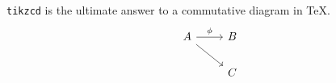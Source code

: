 \documentclass[12pt]{amsart}
\theoremstyle{plain}
\theoremstyle{definition}
\theoremstyle{remark}
\numberwithin{equation}{section} %
\begin{document}
\verb|tikzcd| is the ultimate answer to a commutative diagram in \TeX.
\[ \begin{tikzcd}
		A \arrow[rd] \arrow[r, "\phi"] & B \\
		& C
	\end{tikzcd}  \]



\label{sec:ref}

%	
%		
\end{document}
